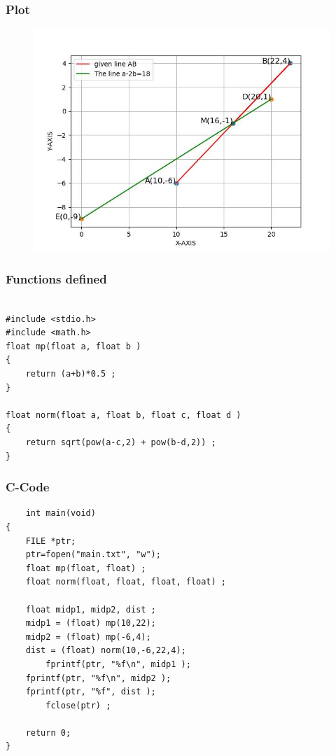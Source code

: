 \documentclass{beamer}
\begin{document}
\begin{frame}
\frametitle{Plot}
\begin{figure}
    \centering
    \includegraphics[width=0.7\linewidth]{figs/value.jpg}
    \caption{}
    \label{fig:enter-label}
\end{figure}
\end{frame}
\begin{frame}[fragile]
\frametitle{Functions defined}
\begin{verbatim}

#include <stdio.h>
#include <math.h>
float mp(float a, float b )
{
	return (a+b)*0.5 ;
}

float norm(float a, float b, float c, float d )
{
    return sqrt(pow(a-c,2) + pow(b-d,2)) ;
}

\end{verbatim}
\end{frame}
\begin{frame}[fragile]
\frametitle{C-Code}
\begin{verbatim}
    int main(void)
{
	FILE *ptr; 
	ptr=fopen("main.txt", "w");
	float mp(float, float) ;
	float norm(float, float, float, float) ;

	float midp1, midp2, dist ;
	midp1 = (float) mp(10,22);
	midp2 = (float) mp(-6,4);
	dist = (float) norm(10,-6,22,4);
        fprintf(ptr, "%f\n", midp1 );
	fprintf(ptr, "%f\n", midp2 );
	fprintf(ptr, "%f", dist );
        fclose(ptr) ;

	return 0;
}
\end{verbatim}
\end{frame}
\end{document}
